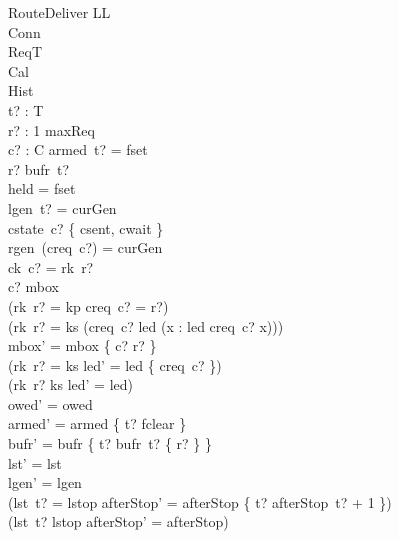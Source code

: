 \documentclass[a4paper,10pt,fleqn]{article}
\begin{document}
\begin{schema}{RouteDeliver}
  \Delta LL \\
  \Xi Conn \\
  \Xi ReqT \\
  \Xi Cal \\
  \Xi Hist \\
  t? : T \\
  r? : 1 \upto maxReq \\
  c? : C
\where
  armed~t? = fset \\
  r? \in bufr~t? \\
  held = fset \\
  lgen~t? = curGen \\
  cstate~c? \in \{ csent, cwait \} \\
  rgen~(creq~c?) = curGen \\
  ck~c? = rk~r? \\
  c? \notin \dom mbox \\
  (rk~r? = kp \implies creq~c? = r?) \\
  (rk~r? = ks \implies
    (creq~c? \in led \land (\forall x : led \spot creq~c? \leq x))) \\
  mbox' = mbox \cup \{ c? \mapsto r? \} \\
  (rk~r? = ks \implies led' = led \setminus \{ creq~c? \}) \\
  (rk~r? \neq ks \implies led' = led) \\
  owed' = owed \\
  armed' = armed \oplus \{ t? \mapsto fclear \} \\
  bufr' = bufr \oplus \{ t? \mapsto bufr~t? \setminus \{ r? \} \} \\
  lst' = lst \\
  lgen' = lgen \\
  (lst~t? = lstop \implies
    afterStop' = afterStop \oplus \{ t? \mapsto afterStop~t? + 1 \}) \\
  (lst~t? \neq lstop \implies afterStop' = afterStop)
\end{schema}
\end{document}
